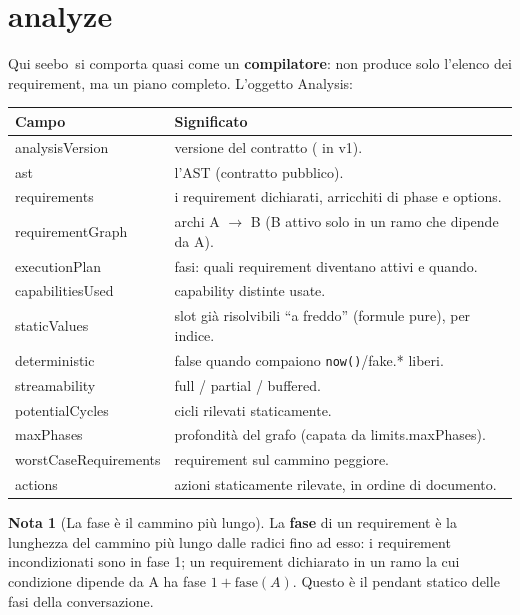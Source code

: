 \documentclass[11pt,a4paper]{book}
\let\code\lstinline
\newcommand{\ic}[1]{{\ttfamily #1}}
\theoremstyle{definition}
\newtheorem*{nota}{Nota}
\newcommand{\seebo}{\textsf{seebo}}
\begin{document}
{{{{\section{analyze}

Qui \seebo\ si comporta quasi come un \textbf{compilatore}: non produce solo
l'elenco dei requirement, ma un piano completo. L'oggetto \ic{Analysis}:

\begin{center}
\small
\begin{tabular}{@{}l p{9.2cm}@{}}
\toprule
\textbf{Campo} & \textbf{Significato} \\
\midrule
\ic{analysisVersion} & versione del contratto (\ic{1} in v1). \\
\ic{ast} & l'AST (contratto pubblico). \\
\ic{requirements} & i requirement dichiarati, arricchiti di \ic{phase} e
\ic{options}. \\
\ic{requirementGraph} & archi \ic{A} $\rightarrow$ \ic{B} (B attivo solo in un ramo
che dipende da A). \\
\ic{executionPlan} & fasi: quali requirement diventano attivi e quando. \\
\ic{capabilitiesUsed} & capability distinte usate. \\
\ic{staticValues} & slot già risolvibili ``a freddo'' (formule pure), per indice. \\
\ic{deterministic} & \ic{false} quando compaiono \code|now()|/\ic{fake.*} liberi. \\
\ic{streamability} & \ic{full} / \ic{partial} / \ic{buffered}. \\
\ic{potentialCycles} & cicli rilevati staticamente. \\
\ic{maxPhases} & profondità del grafo (capata da \ic{limits.maxPhases}). \\
\ic{worstCaseRequirements} & requirement sul cammino peggiore. \\
\ic{actions} & azioni staticamente rilevate, in ordine di documento. \\
\bottomrule
\end{tabular}
\end{center}

\begin{nota}[La fase è il cammino più lungo]
La \textbf{fase} di un requirement è la lunghezza del cammino più lungo dalle
radici fino ad esso: i requirement incondizionati sono in fase 1; un requirement
dichiarato in un ramo la cui condizione dipende da \ic{A} ha fase
$1 + \text{fase}(A)$. Questo è il pendant statico delle fasi della conversazione.
\end{nota}

}}}}
\end{document}

